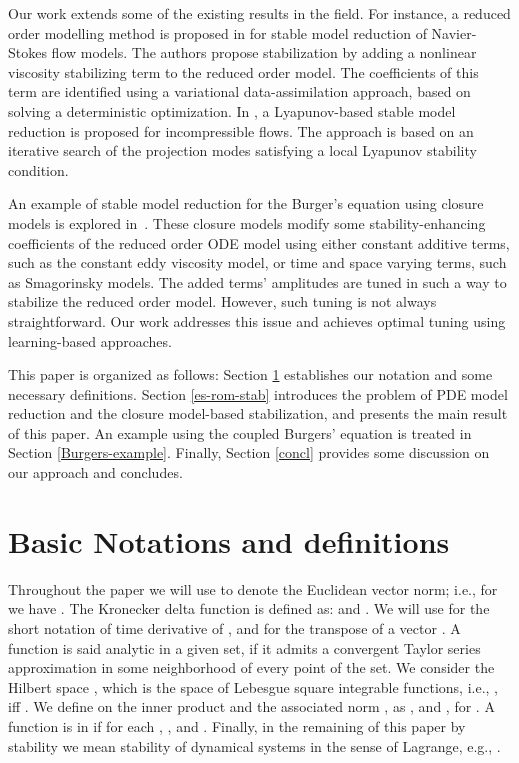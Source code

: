 \documentclass[letterpaper,conference,onecolumn,11pt]{IEEEtran}
\begin{document}
Our work extends some of the existing results in the field. For
instance, a reduced order modelling method is proposed in
\cite{CNTLDBDN13} for stable model reduction of Navier-Stokes flow
models. The authors propose stabilization by adding a nonlinear
viscosity stabilizing term to the reduced order model. The
coefficients of this term are identified using a variational
data-assimilation approach, based on solving a deterministic
optimization. In \cite{BDN13,B13}, a Lyapunov-based stable model
reduction is proposed for incompressible flows. The approach is
based on an iterative search of the projection modes satisfying a
local Lyapunov stability condition.

An example of stable model reduction for the Burger's equation
using closure models is explored in~\cite{SB14,SI13}. These
closure models modify some stability-enhancing coefficients of the
reduced order ODE model using either constant additive terms, such
as the constant eddy viscosity model, or time and space varying
terms, such as Smagorinsky models. The added terms' amplitudes are
tuned in such a way to stabilize the reduced order model. However,
such tuning is not always straightforward. Our work addresses this
issue and achieves optimal tuning using learning-based approaches.

This paper is organized as follows: Section \ref{prem} establishes our
notation and some necessary definitions. Section \ref{es-rom-stab}
introduces the problem of PDE model reduction and the closure
model-based stabilization, and presents the main result of this paper.
An example using the coupled Burgers' equation is treated in Section
\ref{Burgers-example}.  Finally, Section \ref{concl} provides some
discussion on our approach and concludes.

\section{Basic Notations and definitions}
\label{prem}
Throughout the paper we will use  to denote the Euclidean
vector norm; i.e., for  we have . The Kronecker delta function is defined as:
 and . We will
use  for the short notation of time derivative of ,
and  for the transpose of a vector . A function is said
analytic in a given set, if it admits a convergent Taylor series
approximation in some neighborhood of every point of the set. We
consider the Hilbert space , which is
the space of Lebesgue square integrable functions, i.e.,
, iff . We
define on  the inner product  and the associated norm
, as
, and , for
. A function  is in
 if for each ,
, and
.
Finally, in the remaining of this paper by stability we mean
stability of dynamical systems in the sense of Lagrange, e.g.,
\cite{haddad2008}.
\end{document}
